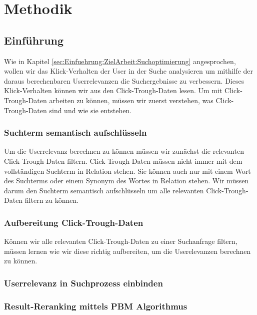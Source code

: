 \section{Methodik}
\label{sec:Einfuehrung:Methodik}

\subsection{Einführung}
\label{sec:Einfuehrung:Methodik:Einfuehrung}

Wie in Kapitel \ref{sec:Einfuehrung:ZielArbeit:Suchoptimierung} angesprochen, wollen wir das Klick-Verhalten der User in der Suche analysieren um mithilfe der daraus berechenbaren Userrelevanzen die Suchergebnisse zu verbessern. Dieses Klick-Verhalten können wir aus den Click-Trough-Daten lesen. Um mit Click-Trough-Daten arbeiten zu können, müssen wir zuerst verstehen, was Click-Trough-Daten sind und wie sie entstehen. 

\subsubsection{Suchterm semantisch aufschlüsseln}
\label{sec:Einfuehrung:Methodik:SuchtermSegmentierung}

Um die Userrelevanz berechnen zu können müssen wir zunächst die relevanten Click-Trough-Daten filtern. Click-Trough-Daten müssen nicht immer mit dem vollständigen Suchterm in Relation stehen. Sie können auch nur mit einem Wort des Suchterms oder einem Synonym des Wortes in Relation stehen. Wir müssen darum den Suchterm semantisch aufschlüsseln um alle relevanten Click-Trough-Daten filtern zu können. 

\subsubsection{Aufbereitung Click-Trough-Daten}
\label{sec:Einfuehrung:Methodik:Click-Trough-Daten}

Können wir alle relevanten Click-Trough-Daten zu einer Suchanfrage filtern, müssen lernen wie wir diese richtig aufbereiten, um die Userelevanzen berechnen zu können. 

\subsubsection{Userrelevanz in Suchprozess einbinden}
\label{sec:Einfuehrung:Methodik:SucheEinbinden}


\subsubsection{Result-Reranking mittels PBM Algorithmus}
\label{sec:Einfuehrung:Methodik:Result-RerankingPBM}

